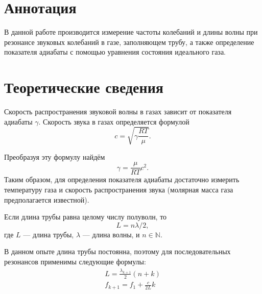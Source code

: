 \documentclass[a4paper]{article}
\title{\work}
\author{Иван Сладков}
\begin{document}
\maketitle
\section{Аннотация}
\thispagestyle{empty}
В данной работе производится измерение частоты колебаний и длины волны при резонансе звуковых колебаний в газе, заполняющем трубу, а также определение показателя адиабаты с помощью уравнения состояния идеального газа.
\section{Теоретические сведения}
Скорость распространения звуковой волны в газах зависит от показателя адиабаты $\gamma$. Скорость звука в газах определяется формулой
\begin{equation}
c = \sqrt{\gamma \frac{R T}{\mu}}.
\label{eq:СкоростьЗвука}
\end{equation}

Преобразуя эту формулу найдём
\begin{equation}
\gamma = \frac{\mu}{R T} c^2.
\label{eq:гамма}
\end{equation}
Таким образом, для определения показателя адиабаты достаточно измерить температуру газа и скорость распространения звука (молярная масса газа предполагается известной).

Если длина трубы равна целому числу полуволн, то
\begin{equation}
L = n \lambda / 2,
\label{eq:ДлинаВолны}
\end{equation}
где $L$ --- длина трубы, $\lambda$ --- длина волны, и $n \in \mathbb{N}$.

В данном опыте длина трубы постоянна, поэтому для последовательных резонансов применимы следующие формулы:
\begin{eqnarray}
\label{eq:ДлинаДляПосл}
L = \frac{\lambda_{k+1}}{2} (n + k) \\
f_{k+1} = f_1 + \frac{c}{2 L} k
\label{eq:Частота}
\end{eqnarray}
\end{document}
